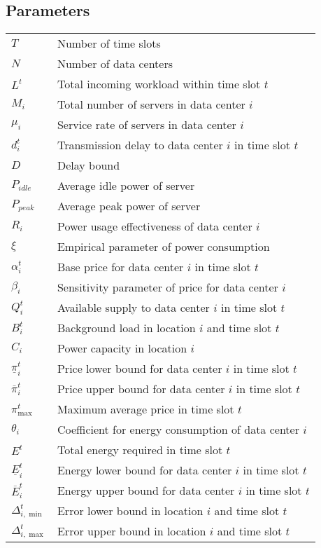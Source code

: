\documentclass[journal]{IEEEtran}
\begin{document}
\subsection*{Parameters}
\begin{tabular}{l l} $T$ &Number of time slots \\
	 $N$ &Number of data centers \\
	 $L^{t}$ &Total incoming workload within time slot $t$ \\
	 $M_{i}$ &Total number of servers in data center $i$\\
	 $\mu_{i}$ &Service rate of servers in data center $i$ \\
	 $d_{i}^{t}$ &Transmission delay to data center $i$ in time slot $t$\\ 
	 $D$ &Delay bound\\ 
	 $P_{idle}$ &Average idle power of server \\
	 $P_{peak}$ &Average peak power of server \\
	 $R_{i}$ &Power usage effectiveness of data center $i$\\
	 $\xi$  &Empirical parameter of power consumption\\
	 $\alpha_{i}^{t}$ &Base price for data center $i$ in time slot $t$\\
	 $\beta_{i}$ &Sensitivity parameter of price for data center $i$\\ 
	 $Q_{i}^{t}$ &Available supply to data center $i$ in time slot $t$\\
	 $B_{i}^{t}$ &Background load in location $i$ and time slot $t$\\ 
	 $C_{i}$ &Power capacity in location $i$ \\
	 $\underline{\pi}_{i}^{t}$ &Price lower bound for data center $i$ in time slot $t$\\
	 $\overline{\pi}_{i}^{t}$ &Price upper bound for data center $i$ in time slot $t$\\
	 $\pi_{\max}^{t}$ &Maximum average price in time slot $t$ \\
	 $\theta_{i}$ &Coefficient for energy consumption of data center $i$ \\
	 $E^{t}$ &Total energy required in time slot $t$ \\
	 $\underline{E}_{i}^{t}$ &Energy lower bound for data center $i$ in time slot $t$ \\
	 $\overline{E}_{i}^{t}$ &Energy upper bound for data center $i$ in time slot $t$ \\
	 $\Delta_{i,\min}^{t}$ &Error lower bound in location $i$ and time slot $t$ \\
	 $\Delta_{i,\max}^{t}$ &Error upper bound in location $i$ and time slot $t$
\end{tabular}
\end{document}
